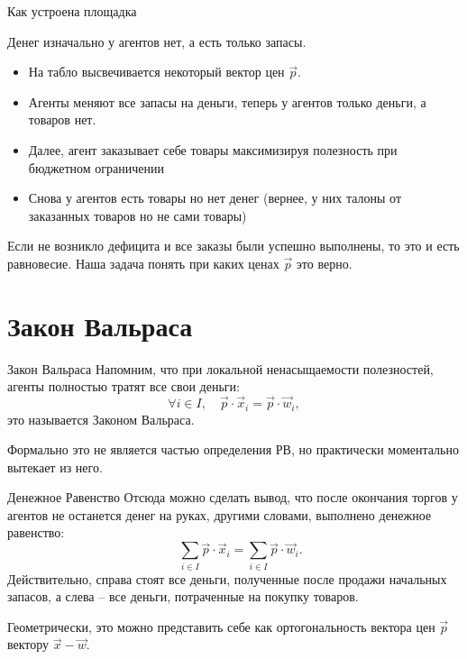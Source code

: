 \documentclass{beamer}
\begin{document}
\begin{frame}{Как устроена площадка}

Денег изначально у агентов нет, а есть только запасы.

\begin{itemize}
  \item На табло высвечивается некоторый вектор цен $\vec p$.
  \item Агенты меняют все запасы на деньги, теперь у агентов только деньги, а товаров нет.
  \item Далее, агент заказывает себе товары максимизируя полезность при бюджетном ограничении
  \item Снова у агентов есть товары но нет денег (вернее, у них талоны от заказанных товаров но не сами товары)
\end{itemize}

Если не возникло дефицита и все заказы были успешно выполнены, то это и есть равновесие. Наша задача понять при каких ценах $\vec p$ это верно.

\end{frame}

\section{Закон Вальраса}
\begin{frame}{Закон Вальраса}
Напомним, что при \alert{локальной ненасыщаемости} полезностей, агенты полностью тратят все свои деньги: 
$$ \forall i \in I, \quad \vec p \cdot \vec x_i = \vec p \cdot \vec w_i,$$
это называется \alert{Законом Вальраса}. 

Формально это не является частью определения РВ, но практически моментально вытекает из него. 
\end{frame}

\begin{frame}{Денежное Равенство}
Отсюда можно сделать вывод, что после окончания торгов у агентов не останется денег на руках, другими словами, выполнено \alert{денежное равенство}:
$$\quad \sum_{i \in I} \vec p \cdot \vec x_i = \sum_{i \in I} \vec p \cdot \vec w_i.$$
Действительно, справа стоят все деньги, полученные после продажи начальных запасов, а слева – все деньги, потраченные на покупку товаров.

Геометрически, это можно представить себе как \alert{ортогональность вектора цен $\vec p$ вектору $\vec x-\vec w$}.

\end{frame}
\end{document}

